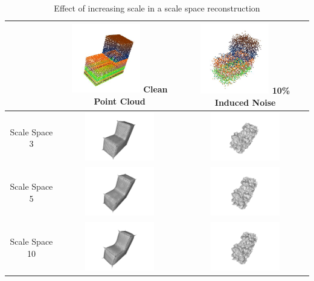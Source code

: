 \documentclass[12pt]{drexelthesis}
\begin{document}
\begin{table}[h]
\centering
\caption[Effect of increasing scale in a scale space reconstruction]{Effect of increasing scale in a scale space reconstruction}
\begin{tabular}{ | c | c | c | }
\hline
& \includegraphics[width=3cm]{l_block_pt_cloud.jpg}
	Clean Point Cloud
& \includegraphics[width=3cm]{l_block_pt_cloud10pnoise.jpg}
	10\% Induced Noise
\\
\hline
Scale Space 3 & \includegraphics[width=3cm]{scalespace/clean/scalespace3.png} & \includegraphics[width=3cm]{scalespace/10pnoise/scale3.png}
\\
\hline
Scale Space 5 & \includegraphics[width=3cm]{scalespace/clean/scalespace5.png} & \includegraphics[width=3cm]{scalespace/10pnoise/scale5.png}
\\
\hline
Scale Space 10 & \includegraphics[width=3cm]{scalespace/clean/scalespace10.png} & \includegraphics[width=3cm]{scalespace/10pnoise/scale10.png}

\end{tabular}
\end{table}
\end{document}
